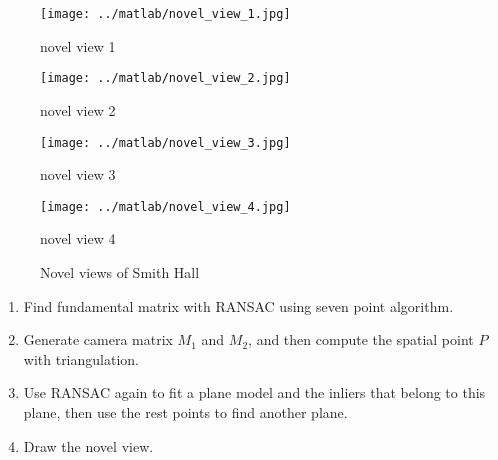 \documentclass[12pt]{article}
\newcounter{list}
\begin{document}
\begin{figure}[htbp]
\begin{minipage}{0.5\linewidth}
\centering \texttt{[image: ../matlab/novel\_view\_1.jpg]}
\caption*{novel view 1}
\end{minipage}
\begin{minipage}{0.5\linewidth}
\centering \texttt{[image: ../matlab/novel\_view\_2.jpg]}
\caption*{novel view 2}
\end{minipage}
\begin{minipage}{0.5\linewidth}
\centering \texttt{[image: ../matlab/novel\_view\_3.jpg]}
\caption*{novel view 3}
\end{minipage}
\begin{minipage}{0.5\linewidth}
\centering \texttt{[image: ../matlab/novel\_view\_4.jpg]}
\caption*{novel view 4}
\end{minipage}
\caption{Novel views of Smith Hall}
\end{figure}

\begin{enumerate}[(1)]
\item Find fundamental matrix with RANSAC using seven point algorithm.
\item Generate camera matrix $M_1$ and $M_2$, and then compute the spatial point $P$ with triangulation.
\item Use RANSAC again to fit a plane model and the inliers that belong to this plane, then use the rest points to find another plane.
\item Draw the novel view.
\end{enumerate}



\end{document}
